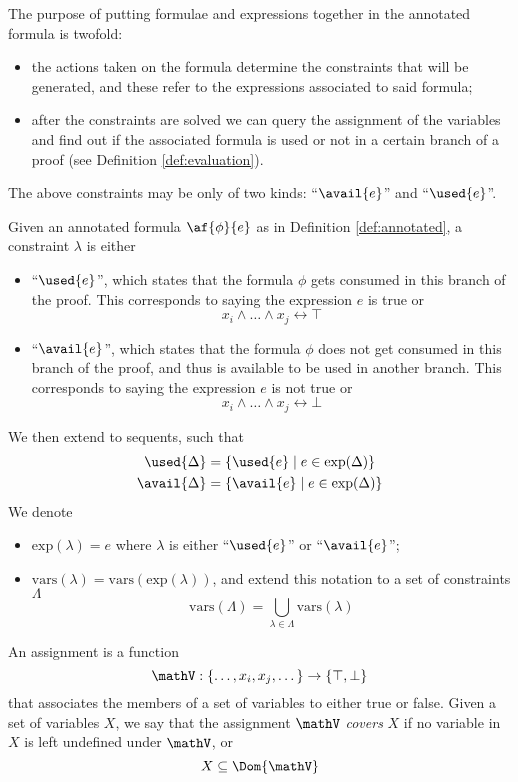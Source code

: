 The purpose of putting formulae and expressions together in the annotated formula is twofold:
\begin{itemize}
	\item the actions taken on the formula determine the constraints that will be generated, and these refer to the expressions associated to said formula;
	\item after the constraints are solved we can query the assignment of the variables and find out if the associated formula is used or not in a certain branch of a proof (see Definition \ref{def:evaluation}).
\end{itemize}
The above constraints may be only of two kinds: ``$\avail{e}$'' and ``$\used{e}$''.
\begin{define}[Constraints]
	\label{def:constraints}
	Given an annotated formula $\af{\phi}{e}$ as in Definition \ref{def:annotated}, a constraint $\lambda$ is either
	\begin{itemize}
		\item ``$\used{e}$'', which states that the formula $\phi$ gets consumed in this branch of the proof.
			This corresponds to saying the expression $e$ is true or
			$$ x_i \wedge \dots \wedge x_j \leftrightarrow \top $$
		\item ``$\avail{e}$'', which states that the formula $\phi$ does not get consumed in this branch of the proof, and thus is available to be used in another branch.
			This corresponds to saying the expression $e$ is not true or
			$$ x_i \wedge \dots \wedge x_j \leftrightarrow \bot $$
	\end{itemize}
	We then extend to sequents, such that
	\begin{align*}
		\used{\Delta} &= \{ \used{e} \mid e \in \mathrm{exp}(\Delta) \} \\
		\avail{\Delta} &= \{ \avail{e} \mid e \in \mathrm{exp}(\Delta) \}
	\end{align*}
	We denote
	\begin{itemize}
		\item $\mathrm{exp}(\lambda) = e$ where $\lambda$ is either ``$\used{e}$'' or ``$\avail{e}$'';
		\item $\mathrm{vars}(\lambda) = \mathrm{vars}(\mathrm{exp}(\lambda))$, and extend this notation to a set of constraints $\Lambda$
			$$ \mathrm{vars}(\Lambda) = \bigcup_{\lambda \in \Lambda} \mathrm{vars}(\lambda) $$
	\end{itemize}
\end{define}
\begin{define}[Assignment]
	\label{def:assignment}
	An assignment is a function
	$$ \mathV : \{ \dots, x_i, x_j, \dots \} \rightarrow \{ \top, \bot \} $$
	that associates the members of a set of variables to either true or false.
	Given a set of variables $X$, we say that the assignment $\mathV$ \textit{covers} $X$ if no variable in $X$ is left undefined under $\mathV$, or
	$$ X \subseteq \Dom{\mathV} $$
\end{define}
